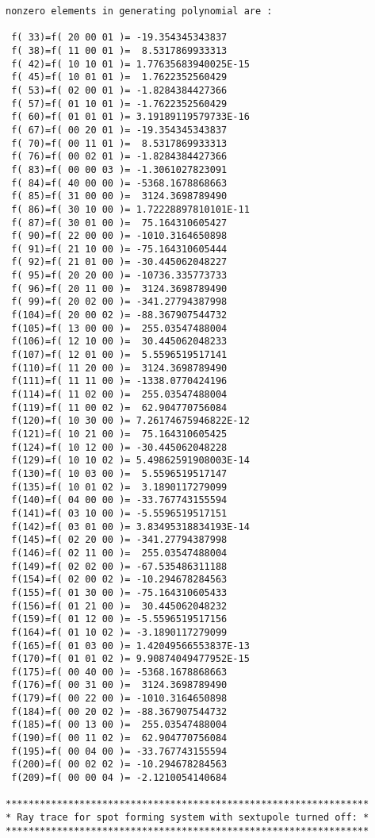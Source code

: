 \begin{footnotesize}
\begin{verbatim}
nonzero elements in generating polynomial are :

 f( 33)=f( 20 00 01 )= -19.354345343837
 f( 38)=f( 11 00 01 )=  8.5317869933313
 f( 42)=f( 10 10 01 )= 1.77635683940025E-15
 f( 45)=f( 10 01 01 )=  1.7622352560429
 f( 53)=f( 02 00 01 )= -1.8284384427366
 f( 57)=f( 01 10 01 )= -1.7622352560429
 f( 60)=f( 01 01 01 )= 3.19189119579733E-16
 f( 67)=f( 00 20 01 )= -19.354345343837
 f( 70)=f( 00 11 01 )=  8.5317869933313
 f( 76)=f( 00 02 01 )= -1.8284384427366
 f( 83)=f( 00 00 03 )= -1.3061027823091
 f( 84)=f( 40 00 00 )= -5368.1678868663
 f( 85)=f( 31 00 00 )=  3124.3698789490
 f( 86)=f( 30 10 00 )= 1.72228897810101E-11
 f( 87)=f( 30 01 00 )=  75.164310605427
 f( 90)=f( 22 00 00 )= -1010.3164650898
 f( 91)=f( 21 10 00 )= -75.164310605444
 f( 92)=f( 21 01 00 )= -30.445062048227
 f( 95)=f( 20 20 00 )= -10736.335773733
 f( 96)=f( 20 11 00 )=  3124.3698789490
 f( 99)=f( 20 02 00 )= -341.27794387998
 f(104)=f( 20 00 02 )= -88.367907544732
 f(105)=f( 13 00 00 )=  255.03547488004
 f(106)=f( 12 10 00 )=  30.445062048233
 f(107)=f( 12 01 00 )=  5.5596519517141
 f(110)=f( 11 20 00 )=  3124.3698789490
 f(111)=f( 11 11 00 )= -1338.0770424196
 f(114)=f( 11 02 00 )=  255.03547488004
 f(119)=f( 11 00 02 )=  62.904770756084
 f(120)=f( 10 30 00 )= 7.26174675946822E-12
 f(121)=f( 10 21 00 )=  75.164310605425
 f(124)=f( 10 12 00 )= -30.445062048228
 f(129)=f( 10 10 02 )= 5.49862591908003E-14
 f(130)=f( 10 03 00 )=  5.5596519517147
 f(135)=f( 10 01 02 )=  3.1890117279099
 f(140)=f( 04 00 00 )= -33.767743155594
 f(141)=f( 03 10 00 )= -5.5596519517151
 f(142)=f( 03 01 00 )= 3.83495318834193E-14
 f(145)=f( 02 20 00 )= -341.27794387998
 f(146)=f( 02 11 00 )=  255.03547488004
 f(149)=f( 02 02 00 )= -67.535486311188
 f(154)=f( 02 00 02 )= -10.294678284563
 f(155)=f( 01 30 00 )= -75.164310605433
 f(156)=f( 01 21 00 )=  30.445062048232
 f(159)=f( 01 12 00 )= -5.5596519517156
 f(164)=f( 01 10 02 )= -3.1890117279099
 f(165)=f( 01 03 00 )= 1.42049566553837E-13
 f(170)=f( 01 01 02 )= 9.90874049477952E-15
 f(175)=f( 00 40 00 )= -5368.1678868663
 f(176)=f( 00 31 00 )=  3124.3698789490
 f(179)=f( 00 22 00 )= -1010.3164650898
 f(184)=f( 00 20 02 )= -88.367907544732
 f(185)=f( 00 13 00 )=  255.03547488004
 f(190)=f( 00 11 02 )=  62.904770756084
 f(195)=f( 00 04 00 )= -33.767743155594
 f(200)=f( 00 02 02 )= -10.294678284563
 f(209)=f( 00 00 04 )= -2.1210054140684

****************************************************************
* Ray trace for spot forming system with sextupole turned off: *
****************************************************************


\end{verbatim}
\end{footnotesize}
